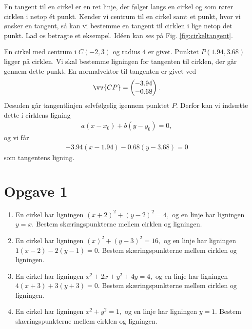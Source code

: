 En tangent til en cirkel er en ret linje, der følger langs en cirkel og som rører cirklen i netop ét punkt. Kender vi centrum til en cirkel samt et punkt, hvor vi ønsker en tangent, så kan vi bestemme en tangent til cirklen i lige netop det punkt. Lad os betragte et eksempel. Idéen kan ses på Fig. \ref{fig:cirkeltangent}.
\begin{figure}[H]
	\centering
	\resizebox{0.5\textwidth}{0.5\textwidth}
	{
	}
\end{figure}
\begin{exa}
	En cirkel med centrum i $C(-2,3)$ og radius $4$ er givet. Punktet $P(1.94, 3.68)$ ligger på cirklen. Vi skal bestemme ligningen for tangenten til cirklen, der går gennem
	dette punkt. En normalvektor til tangenten er givet ved
	\begin{align*}
		\vv{CP} = 
		\begin{pmatrix}
			-3.94 \\ -0.68
		\end{pmatrix}.
	\end{align*}
	Desuden går tangentlinjen selvfølgelig igennem punktet $P$. Derfor kan vi indsætte dette i cirklens ligning
	\begin{align*}
		a(x-x_0) + b(y-y_0)=0,
	\end{align*}
	og vi får
	\begin{align*}
		-3.94(x-1.94) -0.68(y-3.68) = 0
	\end{align*}
	som tangentens ligning. 
\end{exa}

\section*{Opgave 1}
\begin{enumerate}[label=\roman*)]
	\item En cirkel har ligningen $(x+2)^2+(y-2)^2 = 4,$ og en linje har ligningen $y=x$. Bestem skæringspunkterne mellem cirklen og ligningen.
	\item En cirkel har ligningen $(x)^2+(y-3)^2 = 16,$ og en linje har ligningen $1(x-2)-2(y-1)=0$. Bestem skæringspunkterne mellem cirklen og ligningen.
	\item En cirkel har ligningen $x^2+2x+y^2+4y = 4,$ og en linje har ligningen $4(x+3)+3(y+3)=0$. Bestem skæringspunkterne mellem cirklen og ligningen.
	\item En cirkel har ligningen $x^2+y^2=1,$ og en linje har ligningen $y=1$. Bestem skæringspunkterne mellem cirklen og ligningen.
\end{enumerate}

